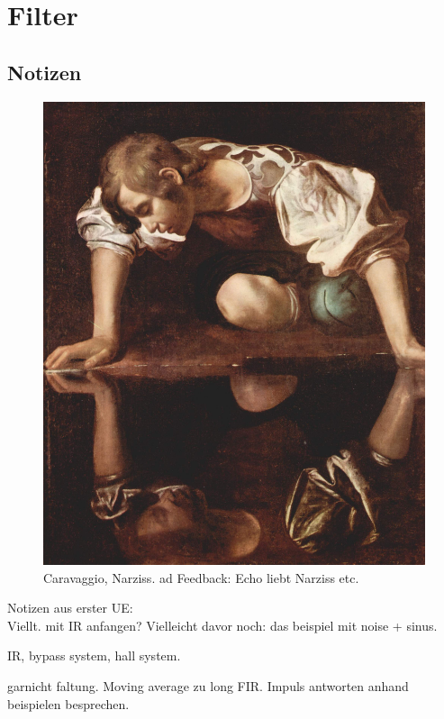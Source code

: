 \chapter{Filter}
\label{Filter}
\section{Notizen}


\begin{figure}[H]
	\begin{center}
		\includegraphics[width = 14cm]{img/Narciss_Caravaggio.jpg}
		\caption{Caravaggio, Narziss. ad Feedback: Echo liebt Narziss etc.}
		\label{fig:name}
	\end{center}
\end{figure}


Notizen aus erster UE:\\
Viellt. mit IR anfangen?
Vielleicht davor noch: das beispiel mit noise + sinus.

IR, bypass system, hall system.

garnicht faltung. Moving average zu long FIR.
Impuls antworten anhand beispielen besprechen.


